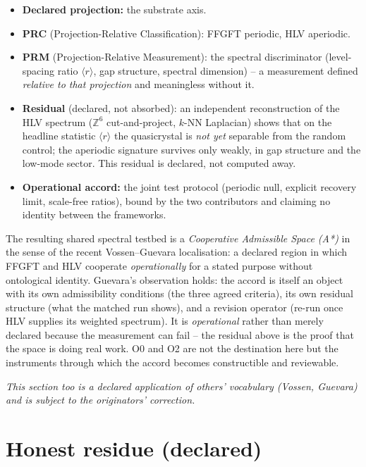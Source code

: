 \begin{itemize}
  \item \textbf{Declared projection:} the substrate axis.
  \item \textbf{PRC} (Projection-Relative Classification): FFGFT periodic, HLV aperiodic.
  \item \textbf{PRM} (Projection-Relative Measurement): the spectral discriminator
        (level-spacing ratio $\langle r\rangle$, gap structure, spectral dimension) -- a measurement
        defined \emph{relative to that projection} and meaningless without it.
  \item \textbf{Residual} (declared, not absorbed): an independent reconstruction of the HLV
        spectrum ($\mathbb{Z}^6$ cut-and-project, $k$-NN Laplacian) shows that on the headline
        statistic $\langle r\rangle$ the quasicrystal is \emph{not yet} separable from the random
        control; the aperiodic signature survives only weakly, in gap structure and the low-mode
        sector. This residual is declared, not computed away.
  \item \textbf{Operational accord:} the joint test protocol (periodic null, explicit recovery
        limit, scale-free ratios), bound by the two contributors and claiming no identity between
        the frameworks.
\end{itemize}

\noindent The resulting shared spectral testbed is a \emph{Cooperative Admissible Space (A*)} in the
sense of the recent Vossen--Guevara localisation: a declared region in which FFGFT and HLV cooperate
\emph{operationally} for a stated purpose without ontological identity. Guevara's observation holds:
the accord is itself an object with its own admissibility conditions (the three agreed criteria), its
own residual structure (what the matched run shows), and a revision operator (re-run once HLV supplies
its weighted spectrum). It is \emph{operational} rather than merely declared because the measurement
can fail -- the residual above is the proof that the space is doing real work. O0 and O2 are not the
destination here but the instruments through which the accord becomes constructible and reviewable.

\medskip\noindent\emph{This section too is a declared application of others' vocabulary (Vossen,
Guevara) and is subject to the originators' correction.}

\section{Honest residue (declared)}


